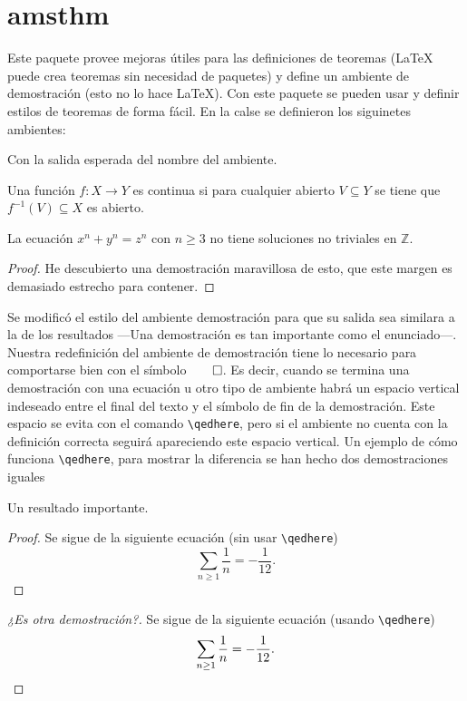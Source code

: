 \section{amsthm}
Este paquete provee mejoras útiles para las definiciones de teoremas
(\LaTeX{} puede crea teoremas sin necesidad de paquetes) y
define un ambiente de demostración (esto no lo hace \LaTeX{}). Con este
paquete se pueden usar y definir estilos de teoremas de forma fácil. En la calse se definieron los siguinetes ambientes:
\begin{center}
\end{center}
Con la salida esperada del nombre del ambiente.

\begin{definicion}
  Una función \(f\colon X\to Y\) es continua si para cualquier abierto
  \(V\subseteq Y\) se tiene que \(f^{-1}(V)\subseteq X\) es abierto.
\end{definicion}

\begin{teorema}[Fermat]%
\label{teo:fermat}
  La ecuación \(x^n + y^n = z^n\) con \(n\geq 3\) no tiene soluciones no triviales en \(\mathbb{Z}\).
\end{teorema}
\begin{proof}
  He descubierto una demostración maravillosa de esto, que este margen es
  demasiado estrecho para contener.
\end{proof}

Se modificó el estilo del ambiente demostración para que su salida sea similara a la de los resultados —Una demostración es tan importante como el
enunciado—. Nuestra redefinición del ambiente de demostración tiene lo necesario para comportarse bien con el símbolo\(\qed \). Es decir, cuando se termina una demostración con una ecuación u otro tipo de ambiente habrá
un espacio vertical indeseado entre el final del texto y el símbolo de fin de la demostración. Este espacio se evita con el comando \verb|\qedhere|, pero si el ambiente no cuenta con la definición correcta seguirá
apareciendo este espacio vertical. Un ejemplo de cómo funciona \verb|\qedhere|, para mostrar la diferencia se han hecho dos demostraciones iguales

\begin{teorema}
  Un resultado importante.
\end{teorema}
\begin{proof}
  Se sigue de la siguiente ecuación (sin usar \verb|\qedhere|)
  \[
    \sum_{n\geq 1}\frac{1}{n}=-\frac{1}{12}.
  \]
\end{proof}
\begin{proof}[¿Es otra demostración?]
  Se sigue de la siguiente ecuación (usando \verb|\qedhere|)
  \[
    \sum_{n\geq 1}\frac{1}{n}=-\frac{1}{12}. \qedhere
  \]
\end{proof}

